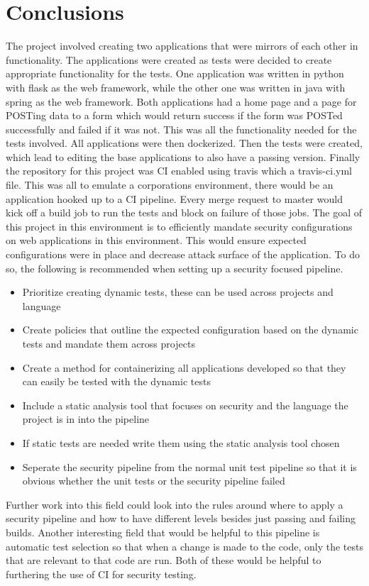\section{Conclusions}
The project involved creating two applications that were mirrors of each other in functionality. The applications were created as tests were decided to create appropriate functionality for the tests.
One application was written in python with flask as the web framework, while the other one was written in java with spring as the web framework. Both applications had a home page and a page for
POSTing data to a form which would return success if the form was POSTed successfully and failed if it was not. This was all the functionality needed for the tests involved.
All applications were then dockerized. Then the tests were created, which lead to editing the base applications to also have a passing version. Finally the repository for this project was CI enabled
using travis which a travis-ci.yml file.
This was all to emulate a corporations environment, there would be an application hooked up to a CI pipeline. Every merge request to master would kick off a build job to run the tests and block on
failure of those jobs. The goal of this project in this environment is to efficiently mandate security configurations on web applications in this environment. This would ensure expected configurations
were in place and decrease attack surface of the application. To do so, the following is recommended when setting up a security focused pipeline.
\begin{itemize}
    \item Prioritize creating dynamic tests, these can be used across projects and language
    \item Create policies that outline the expected configuration based on the dynamic tests and mandate them across projects
    \item Create a method for containerizing all applications developed so that they can easily be tested with the dynamic tests
    \item Include a static analysis tool that focuses on security and the language the project is in into the pipeline
    \item If static tests are needed write them using the static analysis tool chosen
    \item Seperate the security pipeline from the normal unit test pipeline so that it is obvious whether the unit tests or the security pipeline failed 
\end{itemize}
Further work into this field could look into the rules around where to apply a security pipeline and how to have different levels besides just passing and failing builds. Another interesting field that
would be helpful to this pipeline is automatic test selection so that when a change is made to the code, only the tests that are relevant to that code are run. Both of these would be helpful to furthering
the use of CI for security testing.
